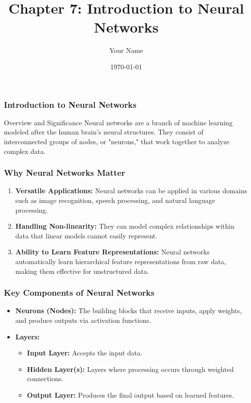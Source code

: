 \documentclass{beamer}
\title{Chapter 7: Introduction to Neural Networks}
\author{Your Name}
\institute{Your Institution}
\date{\today}
\begin{document}
\frame{\titlepage}

\begin{frame}[fragile]
    \frametitle{Introduction to Neural Networks}
    \begin{block}{Overview and Significance}
        Neural networks are a branch of machine learning modeled after the human brain's neural structures. They consist of interconnected groups of nodes, or "neurons," that work together to analyze complex data.
    \end{block}
\end{frame}

\begin{frame}[fragile]
    \frametitle{Why Neural Networks Matter}
    \begin{enumerate}
        \item \textbf{Versatile Applications:} 
        Neural networks can be applied in various domains such as image recognition, speech processing, and natural language processing.
        
        \item \textbf{Handling Non-linearity:} 
        They can model complex relationships within data that linear models cannot easily represent.
        
        \item \textbf{Ability to Learn Feature Representations:} 
        Neural networks automatically learn hierarchical feature representations from raw data, making them effective for unstructured data.
    \end{enumerate}
\end{frame}

\begin{frame}[fragile]
    \frametitle{Key Components of Neural Networks}
    \begin{itemize}
        \item \textbf{Neurons (Nodes):} 
            The building blocks that receive inputs, apply weights, and produce outputs via activation functions.
        \item \textbf{Layers:} 
            \begin{itemize}
                \item \textbf{Input Layer:} Accepts the input data.
                \item \textbf{Hidden Layer(s):} Layers where processing occurs through weighted connections.
                \item \textbf{Output Layer:} Produces the final output based on learned features.
            \end{itemize}
    \end{itemize}
\end{frame}
\end{document}
